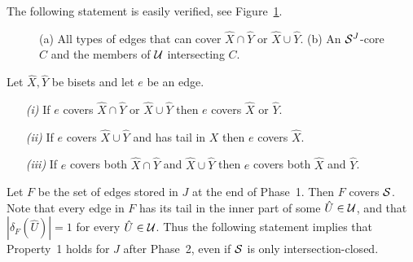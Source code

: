 The following statement is easily verified, see Figure~\ref{f:sets}.

\begin {figure} 
\centering 
{}
   \caption {(a) All types of edges that can cover $\hat{X} \cap \hat{Y}$ or $\hat{X} \cup \hat{Y}$. 
             (b) An ${\cal S}^J$-core $C$ and the members of ${\cal U}$ intersecting $C$.
            }
   \label{f:sets}
\end {figure}

\begin{fact} \label{f:XY}
Let $\hat{X},\hat{Y}$ be bisets and let $e$ be an edge. 
\begin{itemize}
\item[{\em (i)}]
If $e$ covers $\hat{X} \cap \hat{Y}$ or $\hat{X} \cup \hat{Y}$ then $e$ covers $\hat{X}$ or $\hat{Y}$.
\item[{\em (ii)}]
If $e$ covers $\hat{X} \cup \hat{Y}$ and has tail in $X$ then $e$ covers $\hat{X}$. 
\item[{\em (iii)}]
If $e$ covers both $\hat{X} \cap \hat{Y}$ and $\hat{X} \cup \hat{Y}$ then $e$ covers both $\hat{X}$ and $\hat{Y}$.
\end{itemize}
\end{fact}

Let $F$ be the set of edges stored in $J$ at the end of Phase~1.
Then $F$ covers ${\cal S}$. Note that every edge in $F$ 
has its tail in the inner part of some $\hat{U} \in {\cal U}$, and that 
$|\delta_F(\hat{U})|=1$ for every $\hat{U} \in {\cal U}$.
Thus the following statement implies that Property~1 holds for $J$ after Phase~2, 
even if ${\cal S}$ is only intersection-closed.


